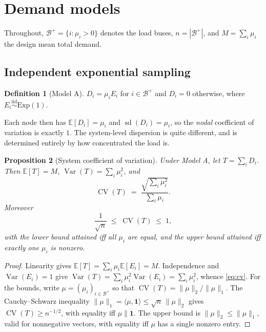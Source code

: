\documentclass[11pt,a4paper]{article}
\theoremstyle{definition}
\newtheorem{definition}{Definition}[section]
\theoremstyle{plain}
\newtheorem{proposition}[definition]{Proposition}
\theoremstyle{remark}
\newcommand{\E}{\mathbb{E}}
\newcommand{\Var}{\operatorname{Var}}
\newcommand{\CV}{\operatorname{CV}}
\newcommand{\one}{\mathbf{1}}
\begin{document}
\section{Demand models}\label{sec:demand}

Throughout, $\mathcal{B}^+ = \{i : \mu_i > 0\}$ denotes the load buses,
$n = |\mathcal{B}^+|$, and $M = \sum_{i} \mu_i$ the design mean total demand.

\subsection{Independent exponential sampling}

\begin{definition}[Model A]\label{def:modelA}
$D_i = \mu_i E_i$ for $i\in\mathcal{B}^+$ and $D_i = 0$ otherwise, where
$E_i \overset{\text{iid}}{\sim} \mathrm{Exp}(1)$.
\end{definition}

Each node then has $\E[D_i] = \mu_i$ and $\operatorname{sd}(D_i) = \mu_i$, so the
\emph{nodal} coefficient of variation is exactly $1$. The system-level dispersion
is quite different, and is determined entirely by how concentrated the load is.

\begin{proposition}[System coefficient of variation]\label{prop:cv}
Under Model A, let $T = \sum_i D_i$. Then $\E[T] = M$,
$\Var(T) = \sum_i \mu_i^2$, and
\begin{equation}\label{eq:cv}
\CV(T) \;=\; \frac{\sqrt{\sum_{i} \mu_i^2}}{\sum_i \mu_i}.
\end{equation}
Moreover
\begin{equation}\label{eq:cvbounds}
\frac{1}{\sqrt{n}} \;\le\; \CV(T) \;\le\; 1,
\end{equation}
with the lower bound attained iff all $\mu_i$ are equal, and the upper bound
attained iff exactly one $\mu_i$ is nonzero.
\end{proposition}

\begin{proof}
Linearity gives $\E[T] = \sum_i \mu_i \E[E_i] = M$. Independence and
$\Var(E_i)=1$ give $\Var(T) = \sum_i \mu_i^2 \Var(E_i) = \sum_i \mu_i^2$, whence
\eqref{eq:cv}. For the bounds, write $\mu = (\mu_i)_{i\in\mathcal{B}^+}$ so that
$\CV(T) = \lVert\mu\rVert_2/\lVert\mu\rVert_1$. The Cauchy--Schwarz inequality
$\lVert\mu\rVert_1 = \langle \mu, \one\rangle \le \sqrt{n}\,\lVert\mu\rVert_2$
gives $\CV(T) \ge n^{-1/2}$, with equality iff $\mu \parallel \one$. The upper
bound is $\lVert\mu\rVert_2 \le \lVert\mu\rVert_1$, valid for nonnegative
vectors, with equality iff $\mu$ has a single nonzero entry.
\end{proof}
\end{document}
